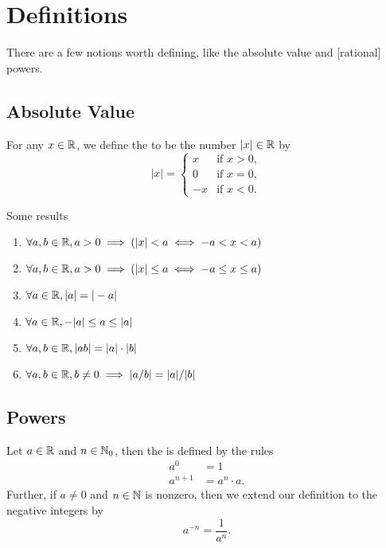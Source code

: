 \section{Definitions}

\M There are a few notions worth defining, like the absolute value and
   [rational] powers.

\subsection{Absolute Value}

\begin{definition}
For any $x\in\mathbb{R}$, we define the  to be
the number $|x|\in\mathbb{R}$ by
\begin{equation}
  |x| = \begin{cases}
     x & \mbox{if } x > 0,\\
     0 & \mbox{if } x = 0,\\
    -x & \mbox{if } x < 0.
  \end{cases}
\end{equation}
\end{definition}

\M Some results
\begin{enumerate}[resume*]
\item $\forall a,b\in\mathbb{R}, a>0\implies (|x|<a \iff -a<x<a)$
\item $\forall a,b\in\mathbb{R}, a>0\implies (|x|\leq a \iff -a\leq x\leq a)$
\item $\forall a\in\mathbb{R}, |a|=|-a|$
\item $\forall a\in\mathbb{R}, -|a| \leq a \leq |a|$
\item $\forall a,b\in\mathbb{R}, |ab|=|a|\cdot|b|$
\item $\forall a,b\in\mathbb{R}, b\neq0\implies |a/b| = |a|/|b|$
\end{enumerate}

\subsection{Powers}

\begin{definition}
Let $a\in\mathbb{R}$ and $n\in\mathbb{N}_{0}$, then the  is defined by
the rules
\begin{subequations}
\begin{align}
a^{0} &= 1\\
a^{n+1} &= a^{n}\cdot a.
\end{align}
\end{subequations}
Further, if $a\neq0$ and $n\in\mathbb{N}$ is nonzero, then we extend our
definition to the negative integers by
\begin{equation}
a^{-n} = \frac{1}{a^{n}}.
\end{equation}
\end{definition}

